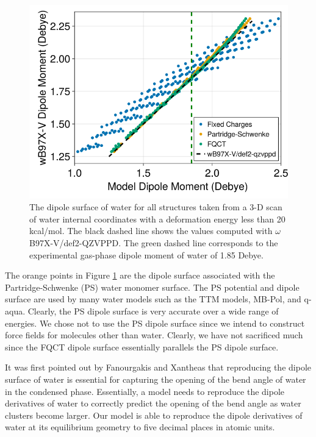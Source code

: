 \documentclass[journal=jctcce,manuscript=article]{achemso}
\begin{document}
\begin{figure}[H]
  \includegraphics*[width=\textwidth]{figures/dipole_surface.png}
  \caption{The dipole surface of water for all structures taken from a
  3-D scan of water internal coordinates with a deformation energy less than
  20 kcal/mol. The black dashed line shows the values computed with $\omega$B97X-V/def2-QZVPPD.
  The green dashed line corresponds to the experimental gas-phase dipole moment
  of water of 1.85 Debye.
}
  \label{fig:dipole_surface}
\end{figure}

The orange points in Figure \ref{fig:dipole_surface} are the dipole surface associated with the Partridge-Schwenke (PS) water monomer surface.\cite{partridge1997determination} The PS potential and dipole surface are used by many water models such as the TTM models,\cite{burnham1999parametrization,fanourgakis2006flexible} MB-Pol\cite{babin2013development,babin2014development}, and q-aqua\cite{yu2022q}. Clearly, the PS dipole surface is very accurate over a wide range of energies. We chose not to use the PS dipole surface since we intend to construct force fields for molecules other than water. Clearly, we have not sacrificed much since the FQCT dipole surface essentially parallels the PS dipole surface.

It was first pointed out by Fanourgakis and Xantheas that reproducing the dipole surface of water is essential for capturing the opening of the bend angle of water in the condensed phase.\cite{fanourgakis2006flexible} Essentially, a model needs to reproduce the dipole derivatives of water to correctly predict the opening of the bend angle as water clusters become larger. Our model is able to reproduce the dipole derivatives of water at its equilibrium geometry to five decimal places in atomic units.
\end{document}
